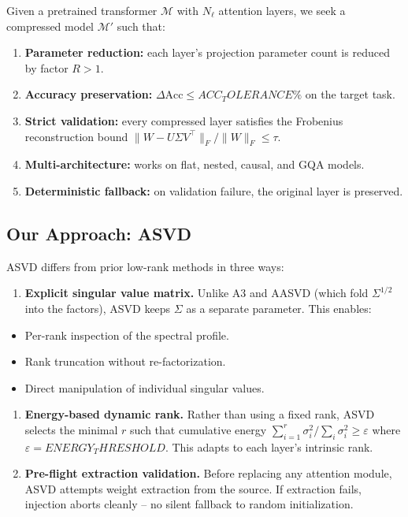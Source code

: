 Given a pretrained transformer $\mathcal{M}$ with $N_\ell$ attention layers, 
we seek a compressed model $\mathcal{M}'$ such that:

\begin{enumerate}
\item \textbf{Parameter reduction:} each layer's projection parameter count is
  reduced by factor $R > 1$.
\item \textbf{Accuracy preservation:} $\Delta\text{Acc} \leq {{ACC_TOLERANCE}}\%$ on
  the target task.
\item \textbf{Strict validation:} every compressed layer satisfies the Frobenius
  reconstruction bound $\|W - U \Sigma V^\top\|_F / \|W\|_F \leq \tau$.
\item \textbf{Multi-architecture:} works on flat, nested, causal, and GQA models.
\item \textbf{Deterministic fallback:} on validation failure, the original layer is
  preserved.

\end{enumerate}
\subsection{Our Approach: ASVD}

ASVD differs from prior low-rank methods in three ways:

\begin{enumerate}
\item \textbf{Explicit singular value matrix.} Unlike A3 and AASVD (which fold
  $\Sigma^{1/2}$ into the factors), ASVD keeps $\Sigma$ as a separate
  parameter. This enables:
\end{enumerate}
\begin{itemize}
\item Per-rank inspection of the spectral profile.
\item Rank truncation without re-factorization.
\item Direct manipulation of individual singular values.

\end{itemize}
\begin{enumerate}
\item \textbf{Energy-based dynamic rank.} Rather than using a fixed rank, ASVD
  selects the minimal $r$ such that cumulative energy
  $\sum_{i=1}^r \sigma_i^2 / \sum_i \sigma_i^2 \geq \varepsilon$ where
  $\varepsilon = {{ENERGY_THRESHOLD}}$. This adapts to each layer's
  intrinsic rank.

\item \textbf{Pre-flight extraction validation.} Before replacing any attention
  module, ASVD attempts weight extraction from the source. If extraction
  fails, injection aborts cleanly -- no silent fallback to random
  initialization.

\end{enumerate}
